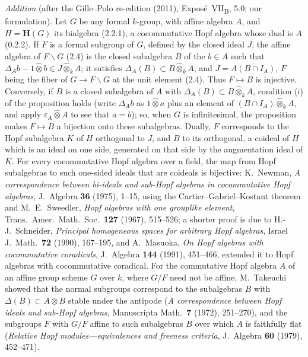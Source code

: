 \medskip
\noindent\emph{Addition} (after the Gille--Polo re-edition (2011),
Expos\'e~VII\textsubscript{B}, 5.0; our formulation). Let \(G\) be any
formal \(k\)-group, with affine algebra \(A\), and \(H=\mathbf H(G)\) its
bialgebra (2.2.1), a cocommutative Hopf algebra whose dual is \(A\)
(0.2.2). If \(F\) is a formal subgroup of \(G\), defined by the closed
ideal \(J\), the affine algebra of \(F\backslash G\) (2.4) is the closed
subalgebra \(B\) of the \(b\in A\) such that
\(\Delta_Ab-1\widehat\otimes b\in J\widehat\otimes_kA\); it satisfies
\(\Delta_A(B)\subset B\widehat\otimes_kA\), and \(J=\overline{A(B\cap
I_A)}\), \(F\) being the fiber of \(G\to F\backslash G\) at the unit
element (2.4). Thus \(F\mapsto B\) is injective. Conversely, if \(B\) is
a closed subalgebra of \(A\) with \(\Delta_A(B)\subset
B\widehat\otimes_kA\), condition \textup{(i)} of the proposition holds
(write \(\Delta_Ab\) as \(1\widehat\otimes a\) plus an element of
\((B\cap I_A)\widehat\otimes_kA\), and apply \(\varepsilon_A\widehat\otimes
A\) to see that \(a=b\)); so, when \(G\) is infinitesimal, the
proposition makes \(F\mapsto B\) a bijection onto these subalgebras. Dually,
\(F\) corresponds to the Hopf subalgebra \(K\) of \(H\) orthogonal to
\(J\), and \(B\) to its orthogonal, a coideal of \(H\) which is an ideal
on one side, generated on that side by the augmentation ideal of \(K\).
For every cocommutative Hopf algebra over a field, the map from Hopf
subalgebras to such one-sided ideals that are coideals is bijective:
K.~Newman, \emph{A correspondence between bi-ideals and sub-Hopf algebras
in cocommutative Hopf algebras}, J.\ Algebra \textbf{36} (1975), 1--15,
using the Cartier--Gabriel--Kostant theorem and M.~E.~Sweedler,
\emph{Hopf algebras with one grouplike element}, Trans.\ Amer.\ Math.\
Soc.\ \textbf{127} (1967), 515--526; a shorter proof is due to
H.-J.~Schneider, \emph{Principal homogeneous spaces for arbitrary Hopf
algebras}, Israel J.\ Math.\ \textbf{72} (1990), 167--195, and
A.~Masuoka, \emph{On Hopf algebras with cocommutative coradicals},
J.\ Algebra \textbf{144} (1991), 451--466, extended it to Hopf algebras
with cocommutative coradical. For the commutative Hopf algebra \(A\) of
an affine group scheme \(G\) over \(k\), where \(G/F\) need not be
affine, M.~Takeuchi showed that the normal subgroups correspond to the
subalgebras \(B\) with \(\Delta(B)\subset A\otimes B\) stable under the
antipode (\emph{A correspondence between Hopf ideals and sub-Hopf
algebras}, Manuscripta Math.\ \textbf{7} (1972), 251--270), and the
subgroups \(F\) with \(G/F\) affine to such subalgebras \(B\) over which
\(A\) is faithfully flat (\emph{Relative Hopf modules---equivalences and
freeness criteria}, J.\ Algebra \textbf{60} (1979), 452--471).
